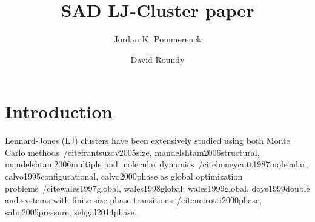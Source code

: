 \documentclass[letterpaper,twocolumn,amsmath,amssymb,pre,aps,10pt]{revtex4-1}
\begin{document}
\title{SAD LJ-Cluster paper
}

\author{Jordan K. Pommerenck} \author{David Roundy}

\begin{abstract}
\end{abstract}

\maketitle

\section{Introduction}


Lennard-Jones (LJ) clusters have been extensively studied using both Monte Carlo methods~/cite{frantsuzov2005size, mandelshtam2006structural, mandelshtam2006multiple} and molecular dynamics~/cite{honeycutt1987molecular, calvo1995configurational, calvo2000phase} as global optimization problems~/cite{wales1997global, wales1998global, wales1999global, doye1999double} and systems with finite size phase transitions~/cite{neirotti2000phase, sabo2005pressure, sehgal2014phase}.
\end{document}
